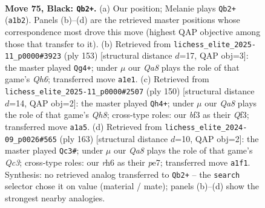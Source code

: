 \documentclass[11pt]{article}
\begin{document}
\clearpage

\begin{figure}[p]\centering
\begin{subfigure}{0.46\textwidth}\centering
\resizebox{\linewidth}{!}{%
\newchessgame
\chessboard[
  setfen={8/8/7R/4b3/8/1p1k1B2/5K2/q7 b - - 7 75},
  showmover=false,
  pgfstyle=straightmove, color=movearrow, markmove={a1-b2}
]}
\caption{}
\end{subfigure}\hfill
\begin{subfigure}{0.46\textwidth}\centering
\resizebox{\linewidth}{!}{%
\newchessgame
\chessboard[
  setfen={8/8/4b3/6K1/4k3/7q/8/8 b - - 3 77},
  showmover=false,
  pgfstyle=straightmove, color=movearrow, markmove={h3-g4}
]}
\caption{}
\end{subfigure}
\\[4pt]
\begin{subfigure}{0.46\textwidth}\centering
\resizebox{\linewidth}{!}{%
\newchessgame
\chessboard[
  setfen={7Q/8/6K1/4B3/2k5/5Q2/8/8 w - - 3 76},
  showmover=false,
  pgfstyle=straightmove, color=movearrow, markmove={h8-h4}
]}
\caption{}
\end{subfigure}\hfill
\begin{subfigure}{0.46\textwidth}\centering
\resizebox{\linewidth}{!}{%
\newchessgame
\chessboard[
  setfen={4b3/4P3/2q5/8/1K4p1/3k4/8/8 b - - 5 82},
  showmover=false,
  pgfstyle=straightmove, color=movearrow, markmove={c6-c3}
]}
\caption{}
\end{subfigure}
\caption{\textbf{Move 75, Black: \texttt{Qb2+}.} (a) Our position; Melanie plays \texttt{Qb2+} (\texttt{a1b2}). Panels (b)--(d) are the retrieved master positions whose correspondence most drove this move (highest QAP objective among those that transfer to it). (b) Retrieved from \texttt{lichess\_elite\_2025-11\_p0000\#3923} (ply 153) [structural distance $d$=17, QAP obj=3]: the master played \texttt{Qg4+}; under $\mu$ our \emph{Qa8} plays the role of that game's \emph{Qh6}; transferred move \texttt{a1e1}. (c) Retrieved from \texttt{lichess\_elite\_2025-11\_p0000\#2507} (ply 150) [structural distance $d$=14, QAP obj=2]: the master played \texttt{Qh4+}; under $\mu$ our \emph{Qa8} plays the role of that game's \emph{Qh8}; cross-type roles: our \emph{b}f3 as their \emph{Q}f3; transferred move \texttt{a1a5}. (d) Retrieved from \texttt{lichess\_elite\_2024-09\_p0026\#565} (ply 163) [structural distance $d$=10, QAP obj=2]: the master played \texttt{Qc3\#}; under $\mu$ our \emph{Qa8} plays the role of that game's \emph{Qc3}; cross-type roles: our \emph{r}h6 as their \emph{p}e7; transferred move \texttt{a1f1}. Synthesis: no retrieved analog transferred to \texttt{Qb2+} -- the \texttt{search} selector chose it on value (material / mate); panels (b)--(d) show the strongest nearby analogies.}
\label{fig:thought-m149}
\end{figure}
\end{document}

